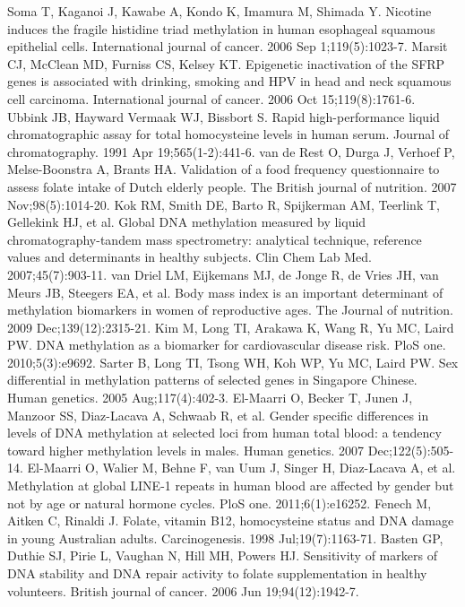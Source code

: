 \begin{thebibliography}{12}
		Soma T, Kaganoi J, Kawabe A, Kondo K, Imamura M, Shimada Y. Nicotine induces the fragile histidine triad methylation in human esophageal squamous epithelial cells. International journal of cancer. 2006 Sep 1;119(5):1023-7. 
		Marsit CJ, McClean MD, Furniss CS, Kelsey KT. Epigenetic inactivation of the SFRP genes is associated with drinking, smoking and HPV in head and neck squamous cell carcinoma. International journal of cancer. 2006 Oct 15;119(8):1761-6. 
		Ubbink JB, Hayward Vermaak WJ, Bissbort S. Rapid high-performance liquid chromatographic assay for total homocysteine levels in human serum. Journal of chromatography. 1991 Apr 19;565(1-2):441-6. 
		van de Rest O, Durga J, Verhoef P, Melse-Boonstra A, Brants HA. Validation of a food frequency questionnaire to assess folate intake of Dutch elderly people. The British journal of nutrition. 2007 Nov;98(5):1014-20. 
		Kok RM, Smith DE, Barto R, Spijkerman AM, Teerlink T, Gellekink HJ, et al. Global DNA methylation measured by liquid chromatography-tandem mass spectrometry: analytical technique, reference values and determinants in healthy subjects. Clin Chem Lab Med. 2007;45(7):903-11. 
		van Driel LM, Eijkemans MJ, de Jonge R, de Vries JH, van Meurs JB, Steegers EA, et al. Body mass index is an important determinant of methylation biomarkers in women of reproductive ages. The Journal of nutrition. 2009 Dec;139(12):2315-21. 
		Kim M, Long TI, Arakawa K, Wang R, Yu MC, Laird PW. DNA methylation as a biomarker for cardiovascular disease risk. PloS one. 2010;5(3):e9692. 
		Sarter B, Long TI, Tsong WH, Koh WP, Yu MC, Laird PW. Sex differential in methylation patterns of selected genes in Singapore Chinese. Human genetics. 2005 Aug;117(4):402-3. 
		El-Maarri O, Becker T, Junen J, Manzoor SS, Diaz-Lacava A, Schwaab R, et al. Gender specific differences in levels of DNA methylation at selected loci from human total blood: a tendency toward higher methylation levels in males. Human genetics. 2007 Dec;122(5):505-14. 
		El-Maarri O, Walier M, Behne F, van Uum J, Singer H, Diaz-Lacava A, et al. Methylation at global LINE-1 repeats in human blood are affected by gender but not by age or natural hormone cycles. PloS one. 2011;6(1):e16252. 
		Fenech M, Aitken C, Rinaldi J. Folate, vitamin B12, homocysteine status and DNA damage in young Australian adults. Carcinogenesis. 1998 Jul;19(7):1163-71. 
		Basten GP, Duthie SJ, Pirie L, Vaughan N, Hill MH, Powers HJ. Sensitivity of markers of DNA stability and DNA repair activity to folate supplementation in healthy volunteers. British journal of cancer. 2006 Jun 19;94(12):1942-7. 

\end{thebibliography}
